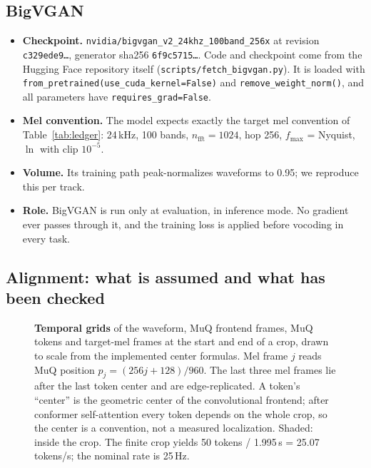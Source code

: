 \documentclass[10pt,letterpaper]{article}
\newcommand{\src}[1]{\nolinkurl{#1}}
\begin{document}
\subsection{BigVGAN}
\begin{itemize}
\item \textbf{Checkpoint.} \texttt{nvidia/bigvgan\_v2\_24khz\_100band\_256x} at revision \texttt{c329ede9\ldots}, generator sha256 \texttt{6f9c5715\ldots}. Code and checkpoint come from the Hugging Face repository itself (\src{scripts/fetch_bigvgan.py}). It is loaded with \texttt{from\_pretrained(use\_cuda\_kernel=False)} and \texttt{remove\_weight\_norm()}, and all parameters have \texttt{requires\_grad=False}.
\item \textbf{Mel convention.} The model expects exactly the target mel convention of Table~\ref{tab:ledger}: 24\,kHz, 100 bands, $n_\mathrm{fft}{=}1024$, hop 256, $f_\mathrm{max}$ = Nyquist, $\ln$ with clip $10^{-5}$.
\item \textbf{Volume.} Its training path peak-normalizes waveforms to 0.95; we reproduce this per track.
\item \textbf{Role.} BigVGAN is run only at evaluation, in inference mode. No gradient ever passes through it, and the training loss is applied before vocoding in every task.
\end{itemize}

\subsection{Alignment: what is assumed and what has been checked}
\begin{figure}[t]
\centering
\resizebox{\textwidth}{!}{}
\caption{\textbf{Temporal grids} of the waveform, MuQ frontend frames, MuQ tokens and target-mel frames at the start and end of a crop, drawn to scale from the implemented center formulas. Mel frame $j$ reads MuQ position $p_j=(256j+128)/960$. The last three mel frames lie after the last token center and are edge-replicated. A token's ``center'' is the geometric center of the convolutional frontend; after conformer self-attention every token depends on the whole crop, so the center is a convention, not a measured localization. Shaded: inside the crop. The finite crop yields 50 tokens / 1.995\,s = 25.07 tokens/s; the nominal rate is 25\,Hz.}
\label{fig:timegrid}
\end{figure}
\end{document}
